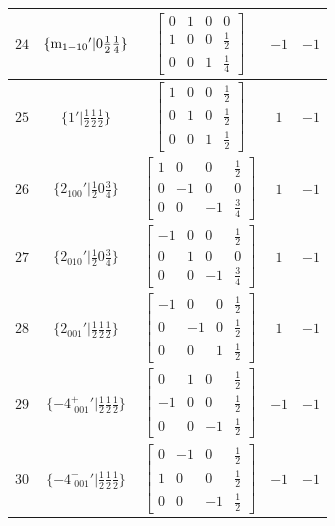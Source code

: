 \documentclass[fleqn,8pt]{jsarticle}
\begin{document}
\begin{longtable}{ccccc}
$ 24 $ & $ \{{\rm m}_{1-10}{}'|0 \frac{1}{2} \frac{1}{4}\} $ & $ \begin{bmatrix} 0 & 1 & 0 & 0 \\ 1 & 0 & 0 & \frac{1}{2} \\ 0 & 0 & 1 & \frac{1}{4} \end{bmatrix} $ & $ -1 $ & $ -1 $ \\ \hline
$ 25 $ & $ \{1{}'|\frac{1}{2} \frac{1}{2} \frac{1}{2}\} $ & $ \begin{bmatrix} 1 & 0 & 0 & \frac{1}{2} \\ 0 & 1 & 0 & \frac{1}{2} \\ 0 & 0 & 1 & \frac{1}{2} \end{bmatrix} $ & $ 1 $ & $ -1 $ \\ \hline
$ 26 $ & $ \{2{}_{100}{}'|\frac{1}{2} 0 \frac{3}{4}\} $ & $ \begin{bmatrix} 1 & 0 & 0 & \frac{1}{2} \\ 0 & -1 & 0 & 0 \\ 0 & 0 & -1 & \frac{3}{4} \end{bmatrix} $ & $ 1 $ & $ -1 $ \\ \hline
$ 27 $ & $ \{2{}_{010}{}'|\frac{1}{2} 0 \frac{3}{4}\} $ & $ \begin{bmatrix} -1 & 0 & 0 & \frac{1}{2} \\ 0 & 1 & 0 & 0 \\ 0 & 0 & -1 & \frac{3}{4} \end{bmatrix} $ & $ 1 $ & $ -1 $ \\ \hline
$ 28 $ & $ \{2{}_{001}{}'|\frac{1}{2} \frac{1}{2} \frac{1}{2}\} $ & $ \begin{bmatrix} -1 & 0 & 0 & \frac{1}{2} \\ 0 & -1 & 0 & \frac{1}{2} \\ 0 & 0 & 1 & \frac{1}{2} \end{bmatrix} $ & $ 1 $ & $ -1 $ \\ \hline
$ 29 $ & $ \{-4^{+}_{\,\,001}{}'|\frac{1}{2} \frac{1}{2} \frac{1}{2}\} $ & $ \begin{bmatrix} 0 & 1 & 0 & \frac{1}{2} \\ -1 & 0 & 0 & \frac{1}{2} \\ 0 & 0 & -1 & \frac{1}{2} \end{bmatrix} $ & $ -1 $ & $ -1 $ \\ \hline
$ 30 $ & $ \{-4^{-}_{\,\,001}{}'|\frac{1}{2} \frac{1}{2} \frac{1}{2}\} $ & $ \begin{bmatrix} 0 & -1 & 0 & \frac{1}{2} \\ 1 & 0 & 0 & \frac{1}{2} \\ 0 & 0 & -1 & \frac{1}{2} \end{bmatrix} $ & $ -1 $ & $ -1 $ \\ \hline

\end{longtable}
\end{document}
